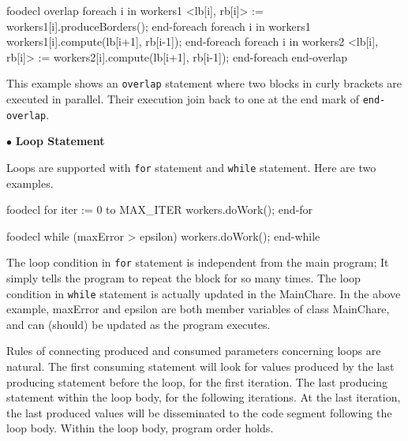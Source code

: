 \documentclass[10pt]{article}
\def\smallfbox#1{{\small \fbox{#1}}}
\def\code#1{{\small {\tt {#1}}}}
\begin{document}
\begin{SaveVerbatim}{foodecl}
  overlap
  {
    foreach i in workers1
      <lb[i], rb[i]> := workers1[i].produceBorders();
    end-foreach
    foreach i in workers1
      workers1[i].compute(lb[i+1], rb[i-1]);
    end-foreach
  }
  {
    foreach i in workers2
      <lb[i], rb[i]> := workers2[i].compute(lb[i+1], rb[i-1]);
    end-foreach
  }
  end-overlap
\end{SaveVerbatim}
\vspace{0.1in}
\smallfbox{\BUseVerbatim{foodecl}}
\vspace{0.1in}

This example shows an \code{overlap} statement where two blocks in curly
brackets are executed in parallel. Their execution join back to one at the end
mark of \code{end-overlap}. 

$\bullet$ {\bf Loop Statement}

Loops are supported with \code{for} statement and \code{while} statement. Here
are two examples.
\begin{SaveVerbatim}{foodecl}
  for iter := 0 to MAX_ITER
     workers.doWork();
  end-for
\end{SaveVerbatim}
\vspace{0.1in}
\smallfbox{\BUseVerbatim{foodecl}}
\vspace{0.1in}
  
\begin{SaveVerbatim}{foodecl}
  while (maxError > epsilon)
     workers.doWork();
  end-while
\end{SaveVerbatim}
\vspace{0.1in}
\smallfbox{\BUseVerbatim{foodecl}}
\vspace{0.1in}

The loop condition in \code{for} statement is independent from the main program;
It simply tells the program to repeat the block for so many times. The loop
condition in \code{while} statement is actually updated in the MainChare. In the
above example, maxError and epsilon are both member variables of class
MainChare, and can (should) be updated as the program executes. 

Rules of connecting produced and consumed parameters concerning loops are
natural. The first consuming statement will look for values produced by the last
producing statement before the loop, for the first iteration. The last
producing statement within the loop body, for the following iterations. At the
last iteration, the last produced values will be disseminated to the code
segment following the loop body. Within the loop body, program order holds. 
\end{document}
